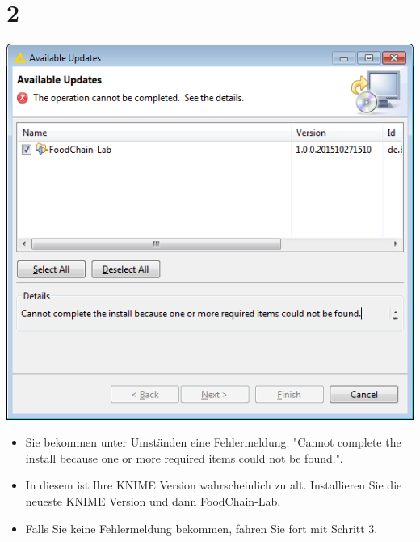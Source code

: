 \documentclass{beamer}
\begin{document}
\section{2}
\begin{frame}
	\begin{center}
  		\includegraphics[height=0.5\textheight]{2.png}
	\end{center}
	\begin{itemize}
		\item Sie bekommen unter Umständen eine Fehlermeldung: "Cannot complete the install because one or more required items could not be found.".
		\item In diesem ist Ihre KNIME Version wahrscheinlich zu alt. Installieren Sie die neueste KNIME Version und dann FoodChain-Lab.
		\item Falls Sie keine Fehlermeldung bekommen, fahren Sie fort mit Schritt 3.
	\end{itemize}
\end{frame}
\end{document}
